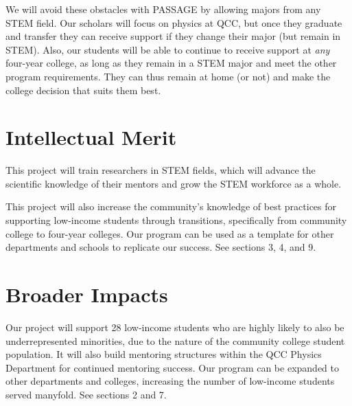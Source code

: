 \documentclass[12pt]{article}
\newcommand\new[1]{{\color{blue}#1}}
\begin{document}
We will avoid these obstacles with PASSAGE by allowing majors from any STEM field.  Our scholars will focus on physics at QCC, but once they graduate and transfer they can receive support if they change their major (but remain in STEM).  Also, our students will be able to continue to receive support at {\em any} four-year college, as long as they remain in a STEM major and meet the other program requirements.  They can thus remain at home (or not) and make the college decision that suits them best.



\vspace{-5mm}

\section{\large{Intellectual Merit}}
\vspace{-3mm}
This project will train researchers in STEM fields, which will advance the scientific knowledge of their mentors and grow the STEM workforce as a whole.

This project will also increase the community's knowledge of best practices for supporting low-income students through transitions, specifically from community college to four-year colleges.  Our program can be used as a template for other departments and schools to replicate our success.  See sections 3, 4, and 9.


\vspace{-5mm}

\section{\large{Broader Impacts}}
\vspace{-3mm}

Our project will support 28 low-income students who are highly likely to also be underrepresented minorities, due to the nature of the community college student population.  It will also build mentoring structures within the QCC Physics Department for continued mentoring success.  Our program can be expanded to other departments and colleges, increasing the number of low-income students served manyfold.  See sections 2 and 7.

\newpage

\end{document}
